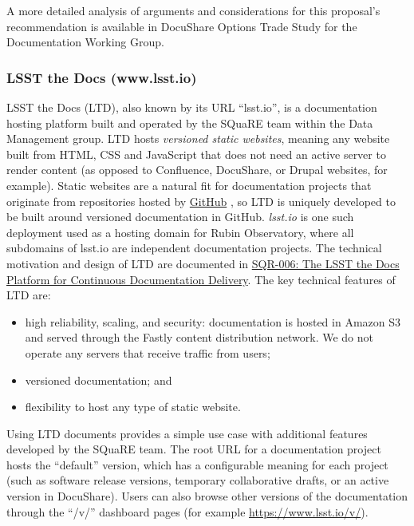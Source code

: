 A more detailed analysis of arguments and considerations for this proposal's recommendation is available in DocuShare Options Trade Study for the Documentation Working Group. 

\subsubsection{LSST the Docs (www.lsst.io)}
\label{sec:LTD}

LSST the Docs (LTD), also known by its URL ``lsst.io'', is a documentation hosting platform built and operated by the SQuaRE team within the Data Management group.
LTD hosts \emph{versioned static websites}, meaning any website built from HTML, CSS and JavaScript that does not need an active server to render content (as opposed to Confluence, DocuShare, or Drupal websites, for example).
Static websites are a natural fit for documentation projects that originate from repositories hosted by \href{https://www.github.com}{GitHub} \citep{GitHub-cite}, so LTD is uniquely developed to be built around versioned documentation in GitHub.
\emph{lsst.io} is one such deployment used as a hosting domain for Rubin Observatory, where all subdomains of lsst.io are independent documentation projects.
The technical motivation and design of LTD are documented in \href{https://sqr-006.lsst.io}{SQR-006: The LSST the Docs Platform for Continuous Documentation Delivery}. 
The key technical features of LTD are:

\begin{itemize}
	\item high reliability, scaling, and security: documentation is hosted in Amazon S3 and served through the Fastly content distribution network.
	We do not operate any servers that receive traffic from users;
	\item versioned documentation; and
	\item flexibility to host any type of static website.
\end{itemize}

Using LTD documents provides a simple use case with additional features developed by the SQuaRE team.
The root URL for a documentation project hosts the ``default'' version, which has a configurable meaning for each project (such as software release versions, temporary collaborative drafts, or an active version in DocuShare).
Users can also browse other versions of the documentation through the ``/v/'' dashboard pages (for example \url{https://www.lsst.io/v/}).

